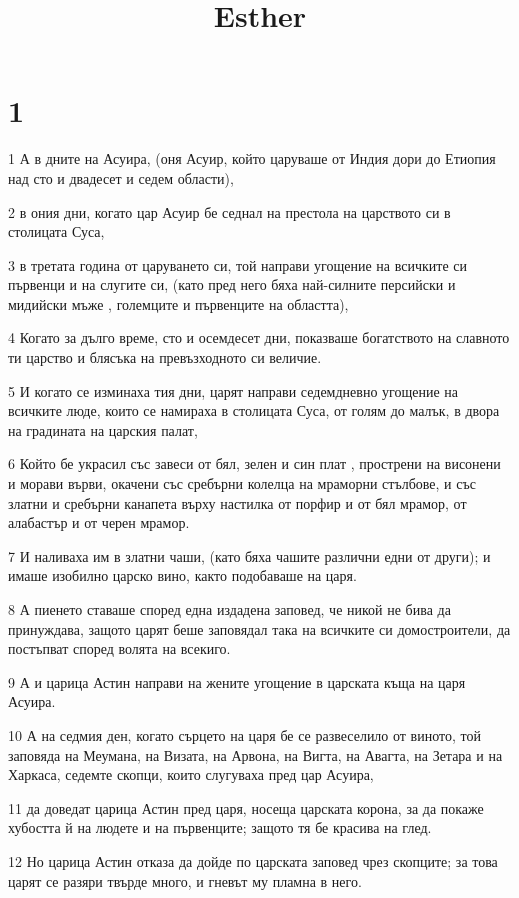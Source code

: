 

\title{Esther}


\chapter{1}

\par 1 А в дните на Асуира, (оня Асуир, който царуваше от Индия дори до Етиопия над сто и двадесет и седем области),
\par 2 в ония дни, когато цар Асуир бе седнал на престола на царството си в столицата Суса,
\par 3 в третата година от царуването си, той направи угощение на всичките си първенци и на слугите си, (като пред него бяха най-силните персийски и мидийски мъже , големците и първенците на областта),
\par 4 Когато за дълго време, сто и осемдесет дни, показваше богатството на славното ти царство и блясъка на превъзходното си величие.
\par 5 И когато се изминаха тия дни, царят направи седемдневно угощение на всичките люде, които се намираха в столицата Суса, от голям до малък, в двора на градината на царския палат,
\par 6 Който бе украсил със завеси от бял, зелен и син плат , прострени на висонени и морави върви, окачени със сребърни колелца на мраморни стълбове, и със златни и сребърни канапета върху настилка от порфир и от бял мрамор, от алабастър и от черен мрамор.
\par 7 И наливаха им в златни чаши, (като бяха чашите различни едни от други); и имаше изобилно царско вино, както подобаваше на царя.
\par 8 А пиенето ставаше според една издадена заповед, че никой не бива да принуждава, защото царят беше заповядал така на всичките си домостроители, да постъпват според волята на всекиго.
\par 9 А и царица Астин направи на жените угощение в царската къща на царя Асуира.
\par 10 А на седмия ден, когато сърцето на царя бе се развеселило от виното, той заповяда на Меумана, на Визата, на Арвона, на Вигта, на Авагта, на Зетара и на Харкаса, седемте скопци, които слугуваха пред цар Асуира,
\par 11 да доведат царица Астин пред царя, носеща царската корона, за да покаже хубостта й на людете и на първенците; защото тя бе красива на глед.
\par 12 Но царица Астин отказа да дойде по царската заповед чрез скопците; за това царят се разяри твърде много, и гневът му пламна в него.

